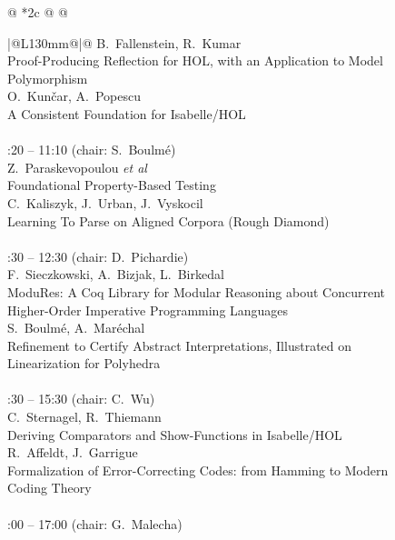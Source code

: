 \documentclass[11pt]{report}
\begin{document}
\begin{figure}[p]
\begin{center}
{\begin{tabular}[t]{@{} *{2}{c @{\hspace{4mm}}} @{}}
\begin{tabular}[t]{|@{\hspace{0.5mm}}L{130mm}@{\hspace{0.5mm}}|@{}}
   B.~Fallenstein, R.~Kumar\\ 
   Proof-Producing Reflection for HOL, with an Application 
   to Model Polymorphism\smallskip\\ 
   O.~Kunčar, A.~Popescu\\ 
   A Consistent Foundation for Isabelle/HOL\\
   \hline
   \\
   :20 -- 11:10 (chair: S.~Boulm\'e)\smallskip\\
   Z.~Paraskevopoulou \textit{et al}\\ 
   Foundational Property-Based Testing\smallskip\\
   C.~Kaliszyk, J.~Urban, J.~Vyskocil\\ 
   Learning To Parse on Aligned Corpora (Rough Diamond)\\
   \hline
   \\
   :30 -- 12:30 (chair: D.~Pichardie)\smallskip\\
   F.~Sieczkowski, A.~Bizjak, L.~Birkedal\\ 
   ModuRes: A Coq Library for Modular Reasoning about Concurrent Higher-Order Imperative Programming 
   Languages\smallskip\\
   S.~Boulmé, A.~Maréchal\\
   Refinement to Certify Abstract Interpretations, Illustrated 
   on Linearization for Polyhedra\\
   \hline
   \\
   :30 -- 15:30 (chair: C.~Wu)\smallskip\\
   C.~Sternagel, R.~Thiemann\\
   Deriving Comparators and Show-Functions in Isabelle/HOL\smallskip\\
   R.~Affeldt, J.~Garrigue\\
   Formalization of Error-Correcting Codes: from Hamming to Modern Coding 
   Theory\\
   \hline
   \\
   :00 -- 17:00 (chair: G.~Malecha)\smallskip\\

\end{tabular}
\end{tabular}}
\end{center}
\end{figure}
\end{document}

